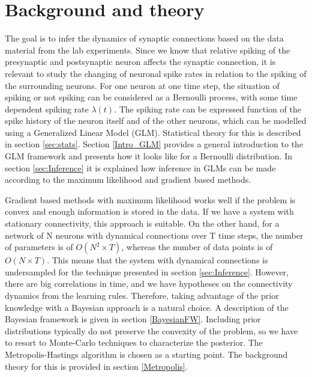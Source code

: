 
\chapter{Background and theory}

The goal is to infer the dynamics of synaptic connections based on the data material from the lab experiments. Since we know that relative spiking of the presynaptic and postsynaptic neuron affects the synaptic connection, it is relevant to study the changing of neuronal spike rates in relation to the spiking of the surrounding neurons. For one neuron at one time step, the situation of spiking or not spiking can be considered as a Bernoulli process, with some time dependent spiking rate $\lambda (t)$. The spiking rate can be expressed function of the spike history of the neuron itself and of the other neurons, which can be modelled using a Generalized Linear Model (GLM). Statistical theory for this is described in section \ref{sec:stats}. Section \ref{Intro_GLM} provides a general introduction to the GLM framework and presents how it looks like for a Bernoulli distribution. In section \ref{sec:Inference} it is explained how inference in GLMs can be made according to the maximum likelihood and gradient based methods. 

Gradient based methods with maximum likelihood works well if the problem is convex and enough information is stored in the data. If we have a system with stationary connectivity, this approach is suitable. On the other hand, for a network of N neurons with dynamical connections over T time steps, the number of parameters is of $O(N^2 \times T)$, whereas the number of data points is of $O(N \times T)$. This means that the system with dynamical connections is undersampled for the technique presented in section \ref{sec:Inference}. However, there are big correlations in time, and we have hypotheses on the connectivity dynamics from the learning rules. Therefore, taking advantage of the prior knowledge with a Bayesian approach is a natural choice. A description of the Bayesian framework is given in section \ref{BayesianFW}. Including prior distributions typically do not preserve the convexity of the problem, so we have to resort to Monte-Carlo techniques to characterize the posterior. The Metropolis-Hastings algorithm is chosen as a starting point. The background theory for this is provided in section \ref{Metropolis}.

